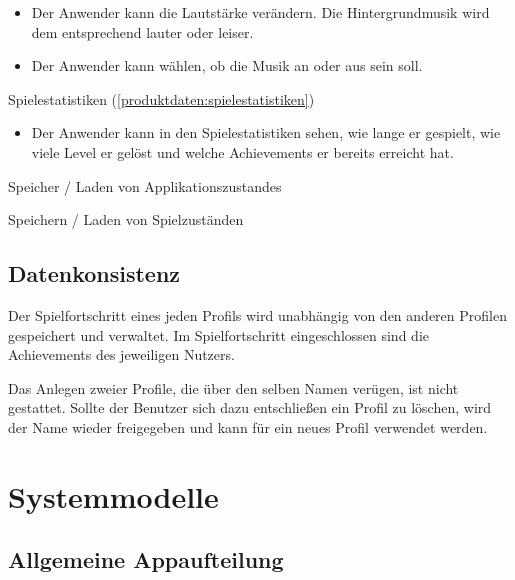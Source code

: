 \documentclass{scrartcl}
\begin{document}
\begin{telist}
\begin{itemize}
		\item Der Anwender kann die Lautstärke verändern. Die Hintergrundmusik wird dem entsprechend lauter oder leiser.
		\item Der Anwender kann wählen, ob die Musik an oder aus sein soll.
	\end{itemize}
	\item Spielestatistiken (\ref{produktdaten:spielestatistiken})
	\begin{itemize}
		\item Der Anwender kann in den Spielestatistiken sehen, wie lange er gespielt, wie viele Level er gelöst und welche Achievements er bereits erreicht hat.
	\end{itemize}
	\item Speicher / Laden von Applikationszustandes
	\item Speichern / Laden von Spielzuständen
\end{telist}

\subsection{Datenkonsistenz}

\begin{telist}[resume]
	\item Der Spielfortschritt eines jeden Profils wird unabhängig von den anderen Profilen gespeichert und verwaltet. Im Spielfortschritt eingeschlossen sind die Achievements des jeweiligen Nutzers.
	\item Das Anlegen zweier Profile, die über den selben Namen verügen, ist nicht gestattet. Sollte der Benutzer sich dazu entschließen ein Profil zu löschen, wird der Name wieder freigegeben und kann für ein neues Profil verwendet werden.
\end{telist}

\clearpage











\section{Systemmodelle}

\subsection{Allgemeine Appaufteilung}
\end{document}
